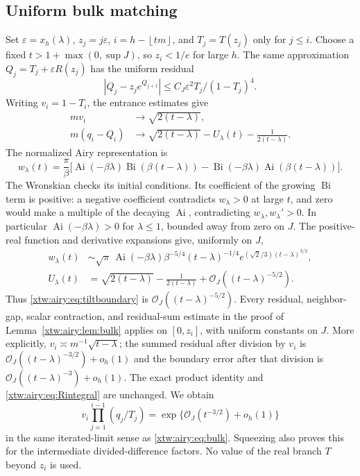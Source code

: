 \documentclass[11pt]{article}
\theoremstyle{remark}\newtheorem{remark}[theorem]{Remark}
\newcommand{\OO}{\mathcal O}
\newcommand{\Ai}{\operatorname{Ai}}
\newcommand{\Bi}{\operatorname{Bi}}
\newcommand{\floor}[1]{\left\lfloor #1\right\rfloor}
\begin{document}
\subsection{Uniform bulk matching}
Set $\varepsilon=x_h(\lambda)$, $z_j=j\varepsilon$,
$i=h-\floor{tm}$, and $T_j=T(z_j)$ only for $j\le i$.
Choose a fixed $t>1+\max(0,\sup J)$, so $z_i<1/e$ for large $h$.
The same approximation $Q_j=T_j+\varepsilon R(z_j)$ has the uniform residual
\[
 |Q_j-z_je^{Q_{j+1}}|\le C_J\varepsilon^2T_j/(1-T_j)^4.
\]
Writing $v_i=1-T_i$, the entrance estimates give
\begin{align}
 mv_i&\longrightarrow\sqrt{2(t-\lambda)},\label{xtw:airy:eq:tiltgap}\\
 m(q_i-Q_i)&\longrightarrow\sqrt{2(t-\lambda)}-U_\lambda(t)
                         -\frac1{2(t-\lambda)}.\label{xtw:airy:eq:tiltboundary}
\end{align}
The normalized Airy representation is
\begin{equation}\label{xtw:airy:eq:shiftairy}
 w_\lambda(t)=\frac\pi\beta\bigl[
 \Ai(-\beta\lambda)\Bi(\beta(t-\lambda))
 -\Bi(-\beta\lambda)\Ai(\beta(t-\lambda))\bigr].
\end{equation}
The Wronskian checks its initial conditions. Its coefficient of the growing
$\Bi$ term is positive: a negative coefficient contradicts $w_\lambda>0$
at large $t$, and zero would make a multiple of the decaying $\Ai$,
contradicting $w_\lambda,w_\lambda'>0$. In particular
$\Ai(-\beta\lambda)>0$ for $\lambda\le1$, bounded away from zero on $J$.
The positive-real function and derivative expansions give, uniformly on $J$,
\begin{align}
 w_\lambda(t)&\sim\sqrt\pi\,\Ai(-\beta\lambda)\beta^{-5/4}
 (t-\lambda)^{-1/4}e^{(\sqrt2/3)(t-\lambda)^{3/2}},\label{xtw:airy:eq:shiftairylarge}\\
 U_\lambda(t)&=\sqrt{2(t-\lambda)}-\frac1{2(t-\lambda)}
                         +\OO_J((t-\lambda)^{-5/2}).\label{xtw:airy:eq:shiftUlarge}
\end{align}
Thus \eqref{xtw:airy:eq:tiltboundary} is $\OO_J((t-\lambda)^{-5/2})$.
Every residual, neighbor-gap, scalar contraction, and residual-sum estimate
in the proof of Lemma~\ref{xtw:airy:lem:bulk} applies on $[0,z_i]$, with uniform
constants on $J$. More explicitly, $v_i\asymp m^{-1}\sqrt{t-\lambda}$;
the summed residual after division by $v_i$ is
$\OO_J((t-\lambda)^{-3/2})+o_h(1)$ and the boundary error after that division
is $\OO_J((t-\lambda)^{-3})+o_h(1)$. The exact product identity and
\eqref{xtw:airy:eq:Rintegral} are unchanged. We obtain
\begin{equation}\label{xtw:airy:eq:tiltbulk}
 v_i\prod_{j=1}^{i-1}(q_j/T_j)
 =\exp\{\OO_J(t^{-3/2})+o_h(1)\}
\end{equation}
in the same iterated-limit sense as \eqref{xtw:airy:eq:bulk}. Squeezing also proves
this for the intermediate divided-difference factors. No value of the real
branch $T$ beyond $z_i$ is used.
\end{document}

